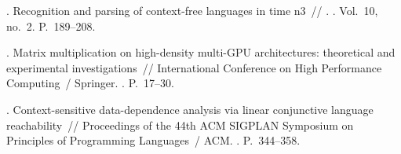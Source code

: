 \begin{thebibliography}{10}
. Recognition and parsing of context-free languages
  in time n3~// . \BibDash
{}. \BibDash
\newblock Vol.~10, no.~2. \BibDash
\newblock P.~189--208.

. Matrix multiplication on high-density
  multi-GPU architectures: theoretical and experimental investigations~//
  International Conference on High Performance Computing~/ Springer. \BibDash
{}. \BibDash
\newblock P.~17--30.

. Context-sensitive data-dependence analysis
  via linear conjunctive language reachability~// Proceedings of the 44th ACM
  SIGPLAN Symposium on Principles of Programming Languages~/ ACM. \BibDash
{}. \BibDash
\newblock P.~344--358.

\end{thebibliography}
